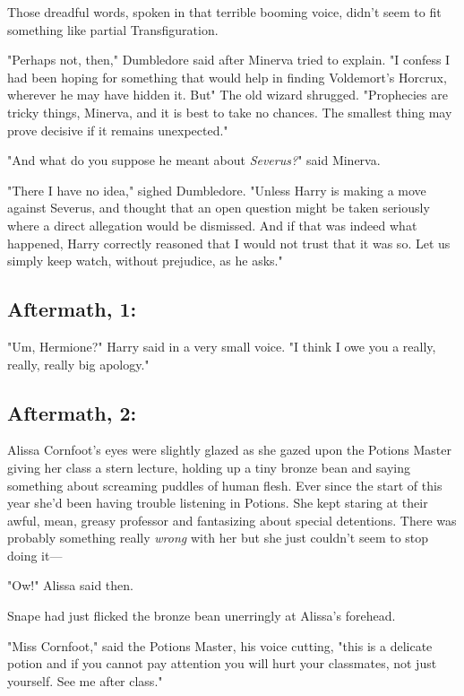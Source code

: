 Those dreadful words, spoken in that terrible booming voice, didn't seem to fit
something like partial Transfiguration.

"Perhaps not, then," Dumbledore said after Minerva tried to explain. "I confess
I had been hoping for something that would help in finding Voldemort's Horcrux,
wherever he may have hidden it. But{\el}" The old wizard shrugged.
"Prophecies are tricky things, Minerva, and it is best to take no chances. The
smallest thing may prove decisive if it remains unexpected."

"And what do you suppose he meant about \emph{Severus?}" said Minerva.

"There I have no idea," sighed Dumbledore. "Unless Harry is making a move
against Severus, and thought that an open question might be taken seriously
where a direct allegation would be dismissed. And if that was indeed what
happened, Harry correctly reasoned that I would not trust that it was so. Let
us simply keep watch, without prejudice, as he asks."
\sbreak
\vspace{-2\baselineskip}
\subsection{Aftermath, 1:}

"Um, Hermione?" Harry said in a very small voice. "I think I owe you a really,
really, really big apology."
\sbreak
\vspace{-2\baselineskip}
\subsection{Aftermath, 2:}

Alissa Cornfoot's eyes were slightly glazed as she gazed upon the Potions
Master giving her class a stern lecture, holding up a tiny bronze bean and
saying something about screaming puddles of human flesh. Ever since the start
of this year she'd been having trouble listening in Potions. She kept staring
at their awful, mean, greasy professor and fantasizing about special
detentions. There was probably something really \emph{wrong} with her but she
just couldn't seem to stop doing it---

"Ow!" Alissa said then.

Snape had just flicked the bronze bean unerringly at Alissa's forehead.

"Miss Cornfoot," said the Potions Master, his voice cutting, "this is a
delicate potion and if you cannot pay attention you will hurt your classmates,
not just yourself. See me after class."

